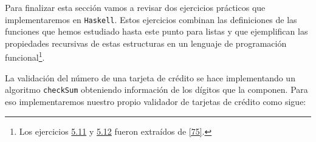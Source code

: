     Para finalizar esta sección vamos a revisar dos ejercicios prácticos que implementaremos en \texttt{Haskell}. Estos ejercicios combinan las definiciones de las funciones que hemos estudiado hasta este punto para listas y que ejemplifican las propiedades recursivas de estas estructuras en un lenguaje de programación funcional\footnote{Los ejercicios \hyperref[sec:511]{5.11} y \hyperref[sec:512]{5.12} fueron extraídos de \hyperlink{75}{[75]}.}.


    \begin{exercise}
     \label{sec:511}	
        La validación del número de una tarjeta de crédito se hace implementando un algoritmo \texttt{checkSum} obteniendo información de los dígitos que la componen. Para eso implementaremos nuestro propio validador de tarjetas de crédito como sigue:\\
    

\end{exercise}
